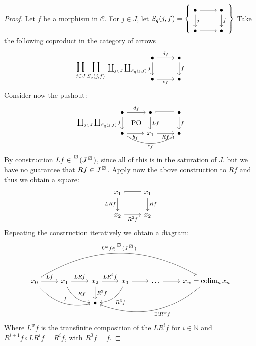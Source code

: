 \begin{proof}
    Let $f$ be a morphism in $\mathcal{C}$.
    For $j \in J$, let $S_q(j,f)=
    \left\{ 
        \begin{tikzcd}
        \bullet
        \ar[d, "j"]
        \ar[r]
        &
        \bullet
        \ar[d, "f"]
        \\
        \bullet 
        \ar[r]
        &
        \bullet
        \end{tikzcd}
    \right\}$
    Take the following coproduct in the category of arrows 
    \[
    \coprod_{j\in J}\coprod_{S_q(j,f)}
    \begin{tikzcd}
        \bullet
        \ar[d, " \coprod_{j\in J}\coprod_{S_q(j,f)}j"']
        \ar[r, "d_f"]
        &
        \bullet
        \ar[d, "f"]
        \\
        \bullet 
        \ar[r, "c_f"']
        &
        \bullet
    \end{tikzcd}
    \]
    Consider now the pushout:
    \[
    \begin{tikzcd}
        \bullet
        \ar[r, "d_f"]
        \ar[d, " \coprod_{j\in J}\coprod_{S_q(j,f)}j"']
        \ar[r, phantom, shift right =3.4ex, "\PO" ]
        &
        \bullet
        \ar[d, "Lf"]
        \ar[r, equal]
        &
        \bullet
        \ar[d, "f"]
        \\
        \bullet
        \ar[rr, bend right,"c_f"']
        \ar[r,"b_f"']
        &
        x_1 
        \ar[r, "Rf"']
        &
        \bullet
    \end{tikzcd}
    \]
    By construction $Lf \in \prescript{\lift{}}{}{(J^{\lift{}})}$, since all of this is in the saturation of $ J $. but we have no guarantee that $Rf \in J^{\lift{}}$.
    Apply now the above construction to $Rf$ and thus we obtain a square:
    \[
    \begin{tikzcd}
        x_1 
        \ar[r, equal]
        \ar[d, "LRf"']
        &
        x_1
        \ar[d, "Rf"]
        \\
        x_2
        \ar[r, "R^2f"']
        &
        x_2
    \end{tikzcd}
    \]
    Repeating the construction iteratively we obtain a diagram:
    \[
    \begin{tikzcd}
        x_0
        \ar[r, "Lf"]
        \ar[rrd, bend right, "f"]
        \ar[rrrrr, bend left, "{L^wf \in \prescript{\lift{}}{}{(J^{\lift{}})}}" ]
        &
        x_1
        \ar[r,"LRf"]
        \ar[rd, bend right, "Rf"]
        &
        x_2
        \ar[r, "LR^2f"]
        \dar["R^2f"]
        &
        x_3
        \ar[r]
        \ar[ld, bend left,"R^3f"]
        &
        \dotsc 
        \rar
        &
        x_w=\colim_n x_n
        \ar[llld, bend left, "\exists ! R^wf"]
        \\
        &&
        \bullet
    \end{tikzcd}
    \]
    Where $L^wf$ is the transfinite composition of the $LR^if$ for $i \in \mathbb{N}$ and $R^{i+1}f \circ LR^if=R^if$, with $R^0f=f$.


\end{proof}
